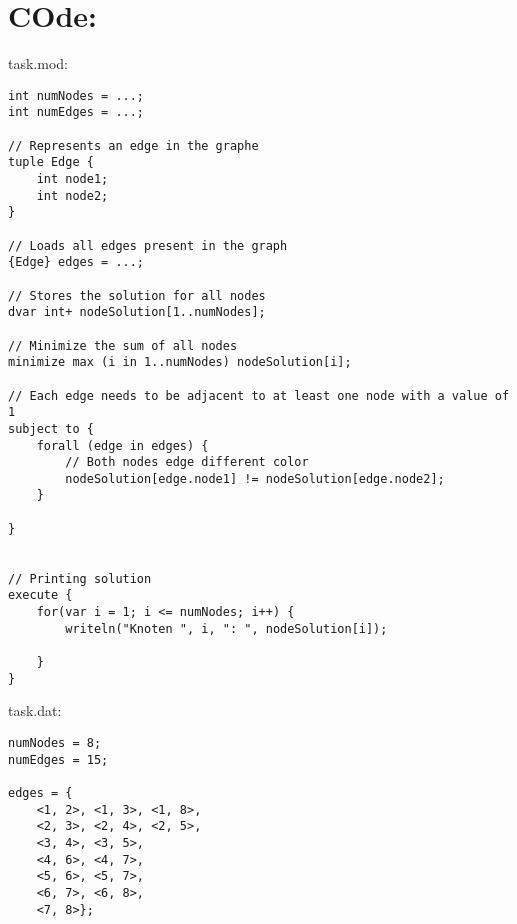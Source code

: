 \documentclass[a4paper]{article}
\begin{document}
\section{COde:}
task.mod:
\begin{lstlisting}
int numNodes = ...;
int numEdges = ...;

// Represents an edge in the graphe
tuple Edge {
    int node1;
    int node2;
}

// Loads all edges present in the graph
{Edge} edges = ...;

// Stores the solution for all nodes
dvar int+ nodeSolution[1..numNodes];

// Minimize the sum of all nodes
minimize max (i in 1..numNodes) nodeSolution[i];

// Each edge needs to be adjacent to at least one node with a value of 1
subject to {
    forall (edge in edges) {
        // Both nodes edge different color
        nodeSolution[edge.node1] != nodeSolution[edge.node2];
    }

}


// Printing solution
execute {
    for(var i = 1; i <= numNodes; i++) {
        writeln("Knoten ", i, ": ", nodeSolution[i]);

    }
}
\end{lstlisting}
task.dat:
\begin{lstlisting}
numNodes = 8;
numEdges = 15;

edges = {
    <1, 2>, <1, 3>, <1, 8>,
    <2, 3>, <2, 4>, <2, 5>,
    <3, 4>, <3, 5>,
    <4, 6>, <4, 7>,
    <5, 6>, <5, 7>,
    <6, 7>, <6, 8>,
    <7, 8>};

\end{lstlisting}
\end{document}
